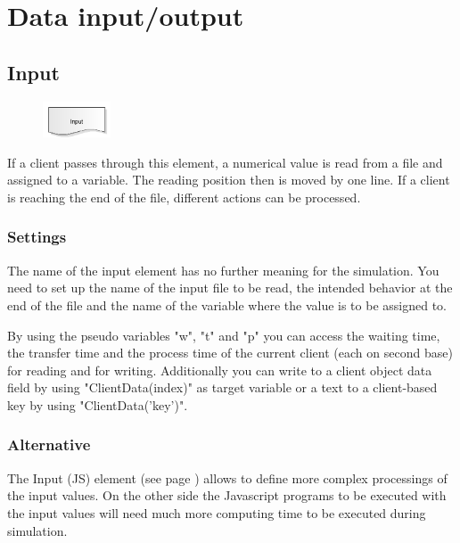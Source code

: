 \chapter{Data input/output}

\section{Input}
\label{ref:ModelElementInput}

\begin{figure}
\vspace{-22pt}
\includegraphics[width=2cm]{imageModelElementInput.png}
\vspace{-22pt}
\end{figure}

If a client passes through this element, a numerical value is read from a file
and assigned to a variable. The reading position then is moved by one line.
If a client is reaching the end of the file, different actions can be processed.

\subsection*{Settings}

The name of the input element has no further meaning for the simulation.
You need to set up the name of the input file to be read, the intended behavior
at the end of the file and the name of the variable where the value is to
be assigned to.

By using the pseudo variables "w", "t" and "p" you can access the waiting time, the transfer time and the
process time of the current client (each on second base) for reading and for writing. Additionally you can
write to a client object data field by using "ClientData(index)" as target variable or a text to a client-based
key by using "ClientData('key')".

\subsection*{Alternative}

The Input (JS) element (see page \pageref{ref:ModelElementInputJS}) allows to define more complex processings
of the input values. On the other side the Javascript programs to be executed with the input values
will need much more computing time to be executed during simulation.


